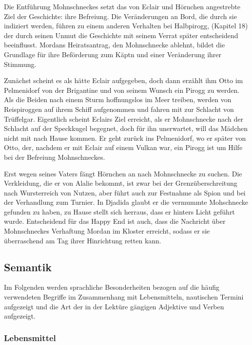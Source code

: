 Die Entführung Mohnschneckes setzt das von Eclair und Hörnchen angestrebte Ziel der Geschichte: ihre Befreiung.  Die Veränderungen an Bord, die durch sie indiziert werden, führen zu einem anderen Verhalten bei Halbpirogg, (Kapitel 18) der durch seinen Unmut die Geschichte mit seinem Verrat später entscheidend beeinflusst. Mordans Heiratsantrag, den Mohnschnecke ablehnt, bildet die Grundlage für ihre Beförderung zum Käptn und einer Veränderung ihrer Stimmung. 

Zunächst scheint es als hätte Eclair aufgegeben, doch dann erzählt ihm Otto im Pelmenidorf von der Brigantine und von seinem Wunsch ein Pirogg zu werden. Als die Beiden nach einem Sturm hoffnungslos im Meer treiben, werden von Reispiroggen auf ihrem Schiff aufgenommen und fahren mit zur Schlacht von Trüffelgar. Eigentlich scheint Eclairs Ziel erreicht, als er Mohnschnecke nach der Schlacht auf der Speckkugel begegnet, doch für ihn unerwartet, will das Mädchen nicht mit nach Hause kommen. Er geht zurück ins Pelmenidorf, wo er später von Otto, der, nachdem er mit Eclair auf einem Vulkan war, ein Pirogg ist um Hilfe bei der Befreiung Mohnschneckes.

Erst wegen seines Vaters fängt Hörnchen an nach Mohnschnecke zu suchen. Die Verkleidung, die er von Alalie bekommt, ist zwar bei der Grenzüberschreitung nach Wursterreich von Nutzen, aber führt auch zur Festnahme als Spion und bei der Verhandlung zum Turnier. In Djadida glaubt er die vermummte Mohschnecke gefunden zu haben, zu Hause stellt sich herraus, dass er hinters Licht geführt wurde. 
Entscheidend für das Happy End ist auch, dass die Nachricht über Mohnschneckes Verhaftung Mordan im Kloster erreicht, sodass er sie überraschend am Tag ihrer Hinrichtung retten kann.

\subsection{Semantik}

Im Folgenden werden sprachliche Besonderheiten bezogen auf die häufig verwendeten Begriffe im Zusammenhang mit Lebensmitteln, nautischen Termini aufgezeigt und die Art der in der Lektüre gängigen Adjektive und Verben aufgezeigt.

\subsubsection{Lebensmittel}

